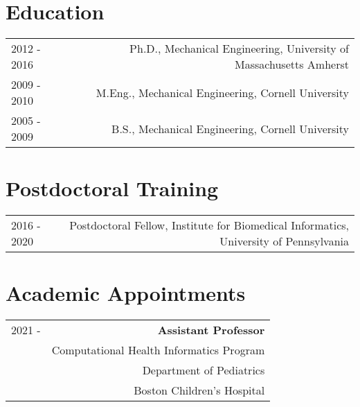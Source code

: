 \section*{Education}
\begin{tabular}{L!{\VRule}R}
2012 - 2016& Ph.D., Mechanical Engineering, University of Massachusetts Amherst\\
2009 - 2010& M.Eng., Mechanical Engineering, Cornell University \\
2005 - 2009& B.S., Mechanical Engineering, Cornell University 
\end{tabular}

\section*{Postdoctoral Training}
\begin{tabular}{L!{\VRule}R}
2016 - 2020 & Postdoctoral Fellow, Institute for Biomedical Informatics, University of Pennsylvania 
\end{tabular}

\section*{Academic Appointments}
\begin{tabular}{L!{\VRule}R}
2021 - & {\bf Assistant Professor} \\
       & Computational Health Informatics Program\\
       & Department of Pediatrics\\
       & Boston Children's Hospital\\
\end{tabular}
